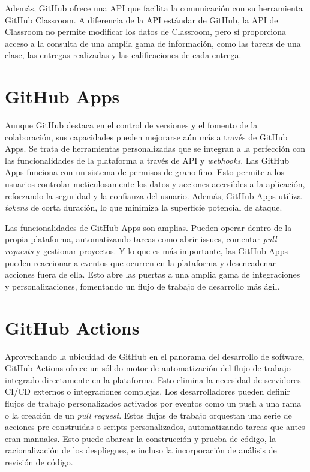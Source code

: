 Además, GitHub ofrece una \acrshort{API} que facilita la comunicación con su herramienta GitHub Classroom. A diferencia de la \acrshort{API} estándar de GitHub, la \acrshort{API} de Classroom no permite modificar los datos de Classroom, pero sí proporciona acceso a la consulta de una amplia gama de información, como las tareas de una clase, las entregas realizadas y las calificaciones de cada entrega.\cite{ClassroomAPI}

\section{GitHub Apps}
Aunque GitHub destaca en el control de versiones y el fomento de la colaboración, sus capacidades pueden mejorarse aún más a través de GitHub Apps. Se trata de herramientas personalizadas que se integran a la perfección con las funcionalidades de la plataforma a través de \acrshort{API} y \textit{webhooks}. Las  GitHub Apps funciona con un sistema de permisos de grano fino. Esto permite a los usuarios controlar meticulosamente los datos y acciones accesibles a la aplicación, reforzando la seguridad y la confianza del usuario. Además, GitHub Apps utiliza \textit{tokens} de corta duración, lo que minimiza la superficie potencial de ataque.\cite{githubAboutApps}

Las funcionalidades de GitHub Apps son amplias. Pueden operar dentro de la propia plataforma, automatizando tareas como abrir issues, comentar \textit{pull requests} y gestionar proyectos. Y lo que es más importante, las GitHub Apps pueden reaccionar a eventos que ocurren en la plataforma y desencadenar acciones fuera de ella. Esto abre las puertas a una amplia gama de integraciones y personalizaciones, fomentando un flujo de trabajo de desarrollo más ágil.

\section{GitHub Actions}
Aprovechando la ubicuidad de GitHub en el panorama del desarrollo de software, GitHub Actions ofrece un sólido motor de automatización del flujo de trabajo integrado directamente en la plataforma. Esto elimina la necesidad de servidores \acrshort{CI/CD} externos o integraciones complejas. Los desarrolladores pueden definir flujos de trabajo personalizados activados por eventos como un push a una rama o la creación de un \textit{pull request}. Estos flujos de trabajo orquestan una serie de acciones pre-construidas o scripts personalizados, automatizando tareas que antes eran manuales.  Esto puede abarcar la construcción y prueba de código, la racionalización de los despliegues, e incluso la incorporación de análisis de revisión de código.\cite{githubUnderstandingActions}

